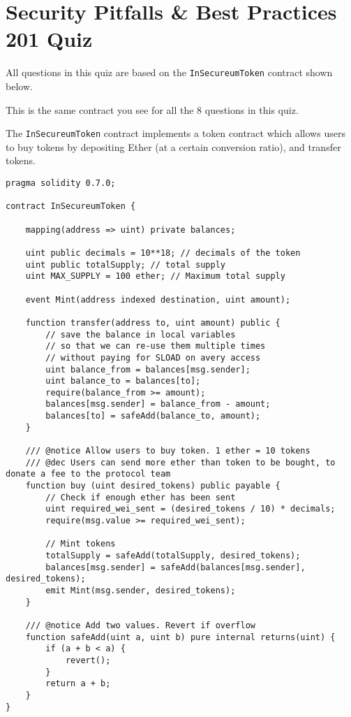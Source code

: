 \section{Security Pitfalls \& Best Practices 201 Quiz}

 All questions in this quiz are based on the \verb|InSecureumToken| contract shown below.

This is the same contract you see for all the 8 questions in this quiz.

The \verb|InSecureumToken| contract implements a token contract which allows users to buy tokens by depositing Ether (at a certain conversion ratio), and transfer tokens.

\begin{lstlisting}[language=Solidity, style=solStyle]
pragma solidity 0.7.0;

contract InSecureumToken {

    mapping(address => uint) private balances;
    
    uint public decimals = 10**18; // decimals of the token
    uint public totalSupply; // total supply
    uint MAX_SUPPLY = 100 ether; // Maximum total supply

    event Mint(address indexed destination, uint amount);
    
    function transfer(address to, uint amount) public {
        // save the balance in local variables
        // so that we can re-use them multiple times
        // without paying for SLOAD on avery access
        uint balance_from = balances[msg.sender];
        uint balance_to = balances[to];
        require(balance_from >= amount);
        balances[msg.sender] = balance_from - amount;
        balances[to] = safeAdd(balance_to, amount);
    }

    /// @notice Allow users to buy token. 1 ether = 10 tokens
    /// @dec Users can send more ether than token to be bought, to donate a fee to the protocol team
    function buy (uint desired_tokens) public payable {
        // Check if enough ether has been sent
        uint required_wei_sent = (desired_tokens / 10) * decimals;
        require(msg.value >= required_wei_sent);
        
        // Mint tokens
        totalSupply = safeAdd(totalSupply, desired_tokens);
        balances[msg.sender] = safeAdd(balances[msg.sender], desired_tokens);
        emit Mint(msg.sender, desired_tokens);
    }
    
    /// @notice Add two values. Revert if overflow
    function safeAdd(uint a, uint b) pure internal returns(uint) {
        if (a + b < a) {
            revert();
        }
        return a + b;
    }
}
\end{lstlisting}

